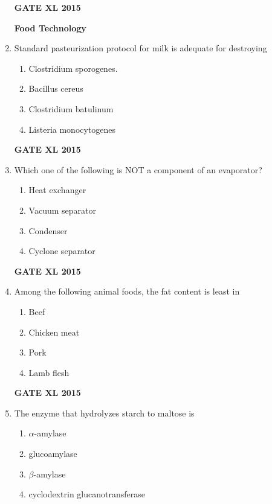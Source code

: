 \documentclass[journal,12pt,onecolumn]{IEEEtran}
\begin{document}
\begin{enumerate}
\begin{enumerate}
    \end{enumerate}
\begin{flushright}\textbf{GATE XL 2015}\end{flushright}
	\textbf{Food Technology}
\item Standard pasteurization protocol for milk is adequate for destroying
    \begin{enumerate}
            \item Clostridium sporogenes.
	    \item Bacillus cereus
	    \item Clostridium batulinum
            \item Listeria monocytogenes
    \end{enumerate}
\begin{flushright}\textbf{GATE XL 2015}\end{flushright}
\item Which one of the following is NOT a component of an evaporator?
    \begin{enumerate}
            \item Heat exchanger
	    \item  Vacuum separator
	    \item Condenser
            \item Cyclone separator
    \end{enumerate}
\begin{flushright}\textbf{GATE XL 2015}\end{flushright}
\item Among the following animal foods, the fat content is least in
    \begin{enumerate}
            \item Beef
	    \item Chicken meat
	    \item Pork
            \item Lamb flesh
    \end{enumerate}
\begin{flushright}\textbf{GATE XL 2015}\end{flushright}
\item The enzyme that hydrolyzes starch to maltose is
    \begin{enumerate}
            \item $\alpha$-amylase
	    \item glucoamylase
	    \item $\beta$-amylase
            \item cyclodextrin glucanotransferase

\end{enumerate}
\end{enumerate}
\end{document}
